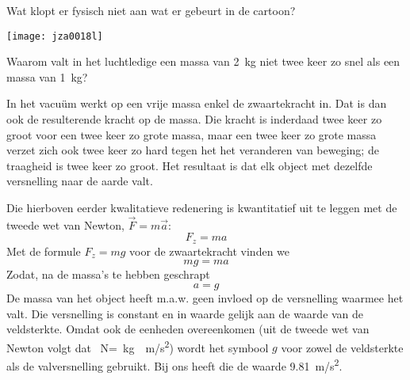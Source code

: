 \documentclass{ximera}
\begin{document}
\begin{exercise}
	Wat klopt er fysisch niet aan wat er gebeurt in de cartoon?%

	\begin{image}
		\texttt{[image: jza0018l]}
	\end{image}
\end{exercise}

\begin{exercise}
	Waarom valt in het luchtledige een massa van \SI{2}{kg} niet twee keer zo snel als een massa van \SI{1}{kg}?

	\begin{oplossing}
		In het vacu\"um werkt op een vrije massa enkel de zwaartekracht in. Dat is dan ook de resulterende kracht op de massa. Die kracht is inderdaad twee keer zo groot voor een twee keer zo grote massa, maar een twee keer zo grote massa verzet zich ook twee keer zo hard tegen het het veranderen van beweging; de traagheid is twee keer zo groot. Het resultaat is dat elk object met dezelfde versnelling naar de aarde valt.

		Die hierboven eerder kwalitatieve redenering is kwantitatief uit te leggen met de tweede wet van Newton, $\vec{F}=m\vec{a}$:
		\begin{equation*}
			F_z=ma
		\end{equation*}
		Met de formule $F_z=mg$ voor de zwaartekracht vinden we
		\begin{equation*}
			mg=ma
		\end{equation*}
		Zodat, na de massa's te hebben geschrapt
		\begin{equation*}
			a=g
		\end{equation*}
		De massa van het object heeft m.a.w. geen invloed op de versnelling waarmee het valt. Die versnelling is constant en in waarde gelijk aan de waarde van de veldsterkte. Omdat ook de eenheden overeenkomen (uit de tweede wet van Newton volgt dat \SI{}{N}=\SI{}{kg\cdot m/s^2}) wordt het symbool $g$ voor zowel de veldsterkte als de valversnelling gebruikt. Bij ons heeft die de waarde \SI{9,81}{m/s^2}.
	\end{oplossing}
\end{exercise}




	
\end{document}
